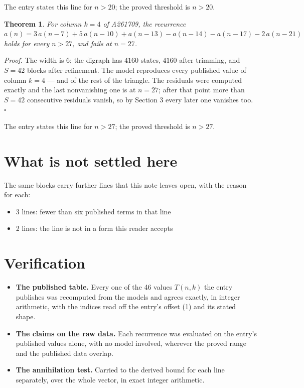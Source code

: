 \documentclass[11pt]{article}
\newtheorem{theorem}{Theorem}
\theoremstyle{definition}
\begin{document}
The entry states this line for $n > 20$; the proved threshold is $n > 20$.

\begin{theorem} For column $k = 4$ of A261709, the recurrence $a(n) = 3\,a(n-7) + 5\,a(n-10) + a(n-13) - a(n-14) - a(n-17) - 2\,a(n-21)$ holds for every $n > 27$, and fails at $n = 27$.\end{theorem}

{\itshape Proof.} The width is $6$; the digraph has $4160$ states, $4160$ after trimming, and $S = 42$ blocks after refinement. The model reproduces every published value of column $k = 4$ --- and of the rest of the triangle. The residuals were computed exactly and the last nonvanishing one is at $n = 27$; after that point more than $S = 42$ consecutive residuals vanish, so by Section 3 every later one vanishes too. $\square$

The entry states this line for $n > 27$; the proved threshold is $n > 27$.

\section{What is not settled here}

The same blocks carry further lines that this note leaves open, with the reason for each:

\begin{itemize}

\item 3 lines: fewer than six published terms in that line

\item 2 lines: the line is not in a form this reader accepts

\end{itemize}

\section{Verification}

\begin{itemize}

\item {\bfseries The published table.} Every one of the 46 values $T(n,k)$ the entry publishes was recomputed from the models and agrees exactly, in integer arithmetic, with the indices read off the entry's offset (1) and its stated shape.

\item {\bfseries The claims on the raw data.} Each recurrence was evaluated on the entry's published values alone, with no model involved, wherever the proved range and the published data overlap.

\item {\bfseries The annihilation test.} Carried to the derived bound for each line separately, over the whole vector, in exact integer arithmetic.

\end{itemize}
\end{document}
